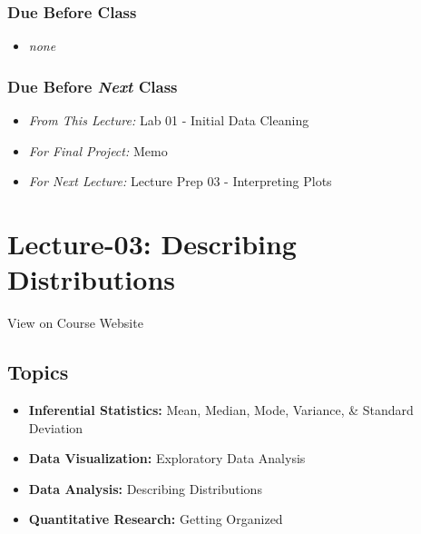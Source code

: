 \documentclass[]{book}
\providecommand{\tightlist}{%
  \setlength{\itemsep}{0pt}\setlength{\parskip}{0pt}}
\theoremstyle{definition}
\theoremstyle{definition}
\theoremstyle{definition}
\theoremstyle{remark}
\begin{document}
\hypertarget{due-before-class-1}{%
\subsubsection*{Due Before Class}\label{due-before-class-1}}

\begin{itemize}
\tightlist
\item
  \emph{none}
\end{itemize}

\hypertarget{due-before-next-class-2}{%
\subsubsection*{\texorpdfstring{Due Before \emph{Next}
Class}{Due Before Next Class}}\label{due-before-next-class-2}}

\begin{itemize}
\tightlist
\item
  \emph{From This Lecture:} Lab 01 - Initial Data Cleaning
\item
  \emph{For Final Project:} Memo
\item
  \emph{For Next Lecture:} Lecture Prep 03 - Interpreting Plots
\end{itemize}

\hypertarget{lecture-03-describing-distributions}{%
\section*{Lecture-03: Describing
Distributions}\label{lecture-03-describing-distributions}}

View on Course Website

\hypertarget{topics-3}{%
\subsection*{Topics}\label{topics-3}}

\begin{itemize}
\tightlist
\item
  \textbf{Inferential Statistics:} Mean, Median, Mode, Variance, \&
  Standard Deviation
\item
  \textbf{Data Visualization:} Exploratory Data Analysis
\item
  \textbf{Data Analysis:} Describing Distributions
\item
  \textbf{Quantitative Research:} Getting Organized
\end{itemize}
\end{document}
